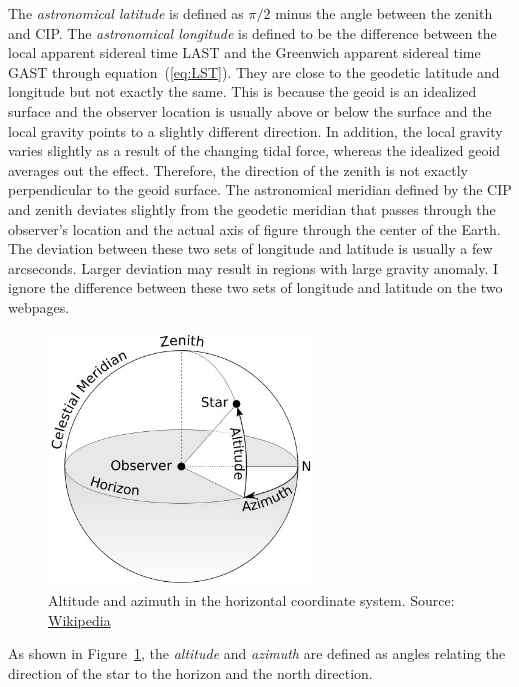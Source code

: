 \documentclass[12pt]{article}
\begin{document}
The {\em astronomical latitude} is defined as $\pi/2$ minus the angle between 
the zenith and CIP. The {\em astronomical longitude} is defined to be the 
difference between the local apparent sidereal time LAST and the Greenwich 
apparent sidereal time GAST through equation~(\ref{eq:LST}).
They are close to the geodetic latitude and longitude but not exactly the same. 
This is because the geoid 
is an idealized surface and the observer location is usually above or below the 
surface and the local gravity points to a slightly different direction. 
In addition, the local gravity varies slightly as a result of the changing 
tidal force, whereas the idealized geoid averages out the effect. Therefore, 
the direction of the zenith is not exactly perpendicular to the geoid surface.
The astronomical meridian defined by the CIP and zenith deviates slightly from the 
geodetic meridian that passes through the observer's location and the actual axis 
of figure through the center of the Earth. The deviation between these two sets 
of longitude and latitude is usually a few arcseconds. Larger deviation may result 
in regions with large gravity anomaly. I ignore the difference between these 
two sets of longitude and latitude on the two webpages.

\begin{figure}[h]
\begin{center}
\includegraphics[width=7cm]{Azimuth-Altitude.jpg}
\end{center}
\caption{Altitude and azimuth in the horizontal coordinate system.
Source: \href{https://en.wikipedia.org/wiki/Horizontal_coordinate_system}{Wikipedia}}
\label{fig:horizontal}
\end{figure}

As shown in Figure~\ref{fig:horizontal}, the {\em altitude} and {\em azimuth} 
are defined as angles relating the direction of the star to the horizon and 
the north direction.
\end{document}
